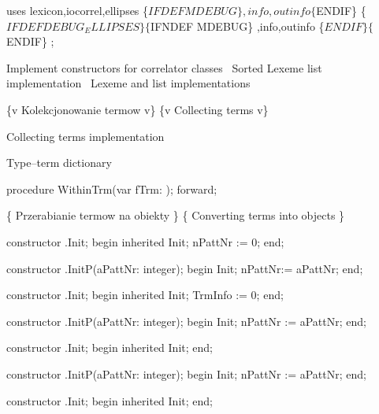 uses lexicon,iocorrel,ellipses
\{$IFDEF MDEBUG\} ,info,outinfo \{$ENDIF\}
\{$IFDEF DEBUG_ELLIPSES\}\{$IFNDEF MDEBUG\} ,info,outinfo \{$ENDIF\}\{$ENDIF\}
;


\LA{}Implement constructors for correlator classes~{\nwtagstyle{}}\RA{}
\LA{}Sorted Lexeme list implementation~{\nwtagstyle{}}\RA{}
\LA{}Lexeme and list implementations~{\nwtagstyle{}}\RA{}

\{v Kolekcjonowanie termow v\} \{v Collecting terms v\}

\LA{}Collecting terms implementation~{\nwtagstyle{}}\RA{}

\LA{}Type--term dictionary~{\nwtagstyle{}}\RA{}
\nwendcode{}\nwdocspar

\nwenddocs{}\endmoddef\nwstartdeflinemarkup{}\nwenddeflinemarkup
procedure WithinTrm(var fTrm: ); forward;

\{ Przerabianie termow na obiekty \} \{ Converting terms into objects \}

constructor .Init;
begin
   inherited Init;
   nPattNr := 0;
end;

constructor .InitP(aPattNr: integer);
begin
   Init;
   nPattNr:= aPattNr;
end;

constructor .Init;
begin
   inherited Init;
   TrmInfo := 0;
end;

constructor .InitP(aPattNr: integer);
begin
   Init;
   nPattNr := aPattNr;
end;

constructor .Init;
begin
   inherited Init;
end;

constructor .InitP(aPattNr: integer);
begin
   Init;
   nPattNr := aPattNr;
end;

constructor .Init;
begin
   inherited Init;
end;

